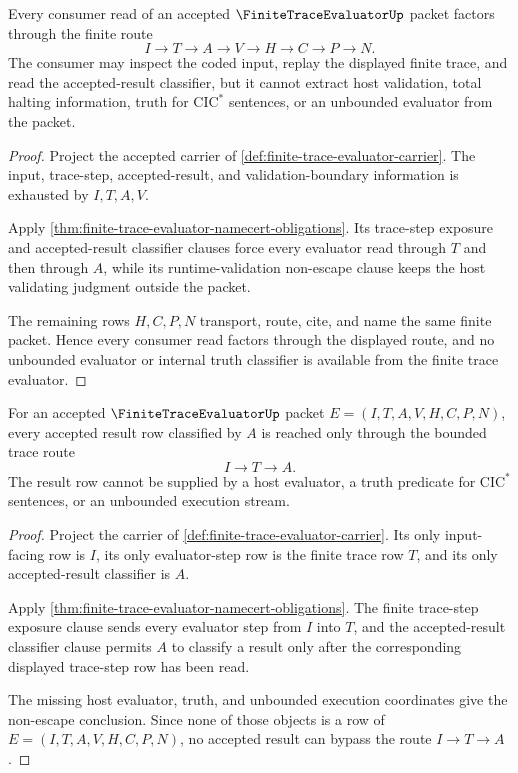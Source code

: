 \begin{theorem}
\label{thm:finite-trace-evaluator-object-level-boundary}
Every consumer read of an accepted $\FiniteTraceEvaluatorUp$ packet factors through the finite route
$$
I \to T \to A \to V \to H \to C \to P \to N.
$$
The consumer may inspect the coded input, replay the displayed finite trace, and read the accepted-result classifier, but it cannot extract host validation, total halting information, truth for $\mathrm{CIC}^{*}$ sentences, or an unbounded evaluator from the packet.
\end{theorem}
\begin{proof}
Project the accepted carrier of \autoref{def:finite-trace-evaluator-carrier}. The input, trace-step, accepted-result, and validation-boundary information is exhausted by $I,T,A,V$.

Apply \autoref{thm:finite-trace-evaluator-namecert-obligations}. Its trace-step exposure and accepted-result classifier clauses force every evaluator read through $T$ and then through $A$, while its runtime-validation non-escape clause keeps the host validating judgment outside the packet.

The remaining rows $H,C,P,N$ transport, route, cite, and name the same finite packet. Hence every consumer read factors through the displayed route, and no unbounded evaluator or internal truth classifier is available from the finite trace evaluator.
\end{proof}

\begin{theorem}
\label{thm:finite-trace-evaluator-trace-result-route}
For an accepted $\FiniteTraceEvaluatorUp$ packet
$E=(I,T,A,V,H,C,P,N)$, every accepted result row classified by $A$ is reached
only through the bounded trace route
$$
I \to T \to A.
$$
The result row cannot be supplied by a host evaluator, a truth predicate for
$\mathrm{CIC}^{*}$ sentences, or an unbounded execution stream.
\end{theorem}
\begin{proof}
Project the carrier of \autoref{def:finite-trace-evaluator-carrier}. Its only
input-facing row is $I$, its only evaluator-step row is the finite trace row
$T$, and its only accepted-result classifier is $A$.

Apply \autoref{thm:finite-trace-evaluator-namecert-obligations}. The finite
trace-step exposure clause sends every evaluator step from $I$ into $T$, and
the accepted-result classifier clause permits $A$ to classify a result only
after the corresponding displayed trace-step row has been read.

The missing host evaluator, truth, and unbounded execution coordinates give the
non-escape conclusion. Since none of those objects is a row of
$E=(I,T,A,V,H,C,P,N)$, no accepted result can bypass the route
$I \to T \to A$.
\end{proof}

